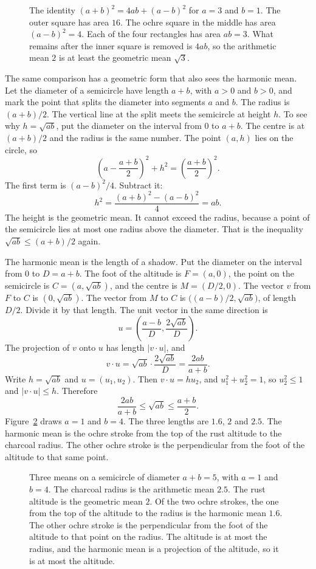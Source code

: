 \begin{figure}[ht]
\centering
{}
\caption{The identity $(a+b)^2=4ab+(a-b)^2$ for $a=3$ and $b=1$. The outer square has area $16$. The ochre square in the middle has area $(a-b)^2=4$. Each of the four rectangles has area $ab=3$. What remains after the inner square is removed is $4ab$, so the arithmetic mean $2$ is at least the geometric mean $\sqrt3$.}
\label{fig:frame}
\end{figure}

The same comparison has a geometric form that also sees the harmonic mean. Let the diameter of a semicircle have length $a+b$, with $a>0$ and $b>0$, and mark the point that splits the diameter into segments $a$ and $b$. The radius is $(a+b)/2$. The vertical line at the split meets the semicircle at height $h$. To see why $h=\sqrt{ab}$, put the diameter on the interval from $0$ to $a+b$. The centre is at $(a+b)/2$ and the radius is the same number. The point $(a,h)$ lies on the circle, so
\[
\left(a-\frac{a+b}2\right)^2+h^2=\left(\frac{a+b}2\right)^2.
\]
The first term is $(a-b)^2/4$. Subtract it:
\[
h^2=\frac{(a+b)^2-(a-b)^2}4=ab.
\]
The height is the geometric mean. It cannot exceed the radius, because a point of the semicircle lies at most one radius above the diameter. That is the inequality $\sqrt{ab}\le(a+b)/2$ again.

The harmonic mean is the length of a shadow. Put the diameter on the interval from $0$ to $D=a+b$. The foot of the altitude is $F=(a,0)$, the point on the semicircle is $C=(a,\sqrt{ab})$, and the centre is $M=(D/2,0)$. The vector $v$ from $F$ to $C$ is $(0,\sqrt{ab})$. The vector from $M$ to $C$ is $\bigl((a-b)/2,\sqrt{ab}\bigr)$, of length $D/2$. Divide it by that length. The unit vector in the same direction is
\[
u=\left(\frac{a-b}{D},\frac{2\sqrt{ab}}{D}\right).
\]
The projection of $v$ onto $u$ has length $|v\cdot u|$, and
\[
v\cdot u=\sqrt{ab}\cdot\frac{2\sqrt{ab}}{D}=\frac{2ab}{a+b}.
\]
Write $h=\sqrt{ab}$ and $u=(u_1,u_2)$. Then $v\cdot u=hu_2$, and $u_1^2+u_2^2=1$, so $u_2^2\le1$ and $|v\cdot u|\le h$. Therefore
\[
\frac{2ab}{a+b}\le\sqrt{ab}\le\frac{a+b}2.
\]
Figure~\ref{fig:semicircle} draws $a=1$ and $b=4$. The three lengths are $1.6$, $2$ and $2.5$. The harmonic mean is the ochre stroke from the top of the rust altitude to the charcoal radius. The other ochre stroke is the perpendicular from the foot of the altitude to that same point.

\begin{figure}[ht]
\centering
{}
\caption{Three means on a semicircle of diameter $a+b=5$, with $a=1$ and $b=4$. The charcoal radius is the arithmetic mean $2.5$. The rust altitude is the geometric mean $2$. Of the two ochre strokes, the one from the top of the altitude to the radius is the harmonic mean $1.6$. The other ochre stroke is the perpendicular from the foot of the altitude to that point on the radius. The altitude is at most the radius, and the harmonic mean is a projection of the altitude, so it is at most the altitude.}
\label{fig:semicircle}
\end{figure}

